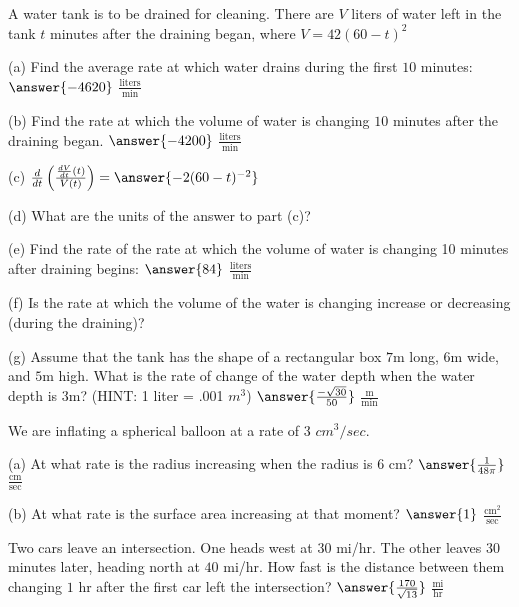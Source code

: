 \documentclass{ximera}
\begin{document}
\begin{exercise}
A water tank is to be drained for cleaning. There are $V$ liters of water left in the tank $t$ minutes after the draining began, where $V=42(60-t)^2$

(a) Find the average rate at which water drains during the first $10$ minutes: $\answer{-4620}$ $\frac{\text{liters}}{\text{min}}$

(b) Find the rate at which the volume of water is changing $10$ minutes after the draining began. $\answer{-4200}$ $\frac{\text{liters}}{\text{min}}$

(c) $\frac{d}{dt}\left(\frac{\frac{dV}{dt}(t)}{V(t)}\right)=\answer{-2(60-t)^{-2}}$

(d) What are the units of the answer to part (c)?

(e) Find the rate of the rate at which the volume of water is changing 10 minutes after draining begins: $\answer{84}$ $\frac{\text{liters}}{\text{min}}$

(f) Is the rate at which the volume of the water is changing increase or decreasing (during the draining)? 
\begin{multipleChoice}
\end{multipleChoice}

(g) Assume that the tank has the shape of a rectangular box $7$m long, $6$m wide, and $5$m high. What is the rate of change of the water depth when the water depth is $3$m? (HINT: 1 liter = .001 $m^3$) $\answer{\frac{-\sqrt{30}}{50}}$ $\frac{\text{m}}{\text{min}}$

\end{exercise}

\begin{exercise}
We are inflating a spherical balloon at a rate of 3 $cm^3/sec$. 

(a) At what rate is the radius increasing when the radius is $6$ cm? $\answer{\frac{1}{48\pi}}$ $\frac{\text{cm}}{\text{sec}}$

(b) At what rate is the surface area increasing at that moment? $\answer{1}$ $\frac{\text{cm}^2}{\text{sec}}$
\end{exercise}

\begin{exercise}
Two cars leave an intersection. One heads west at $30$ mi/hr. The other leaves 30 minutes later, heading north at $40$ mi/hr. How fast is the distance between them changing $1$ hr after the first car left the intersection? $\answer{\frac{170}{\sqrt{13}}}$ $\frac{\text{mi}}{\text{hr}}$

\end{exercise}
\end{document}
